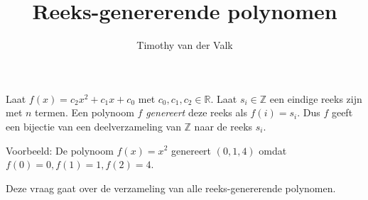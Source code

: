 \documentclass{exam}
\title{Reeks-genererende polynomen}
\author{Timothy van der Valk}
\begin{document}
\maketitle

\begin{questions}

\question Laat $f(x) = c_2 x^2 + c_1 x + c_0$ met $c_0,c_1,c_2 \in \mathbb{R}$. 
Laat $s_i \in \mathbb{Z}$ een eindige reeks zijn met $n$ termen. Een polynoom $f$ \textit{genereert}
deze reeks als $f(i) = s_i$. Dus $f$ geeft een bijectie van een 
deelverzameling van $\mathbb{Z}$ naar de reeks $s_i$.

Voorbeeld: De polynoom $f(x) = x^2$ genereert $(0, 1, 4)$ omdat $f(0) = 0, f(1) = 1, f(2) = 4$.


\question Deze vraag gaat over de verzameling van alle reeks-genererende
polynomen.

\end{questions}
\end{document}
